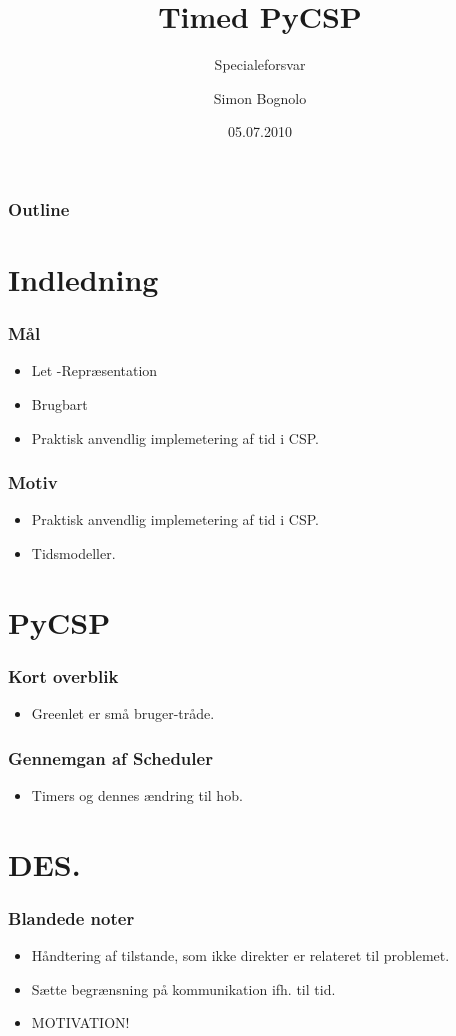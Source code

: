 \documentclass{beamer}
\title
{Timed PyCSP}
\subtitle
{Specialeforsvar}
\author
{Simon Bognolo}
\date
{05.07.2010}
\begin{document}
\begin{frame}
  \titlepage
\end{frame}

\begin{frame}
  \frametitle{Outline}
  \tableofcontents
\end{frame}

\section{Indledning}
\begin{frame}
  \frametitle{Mål}
  \begin{itemize}
	\item Let -Repræsentation
	\item Brugbart
	\item Praktisk anvendlig implemetering af tid i CSP.
  \end{itemize}
\end{frame}

\begin{frame}
  \frametitle{Motiv}
  \begin{itemize}
	\item Praktisk anvendlig implemetering af tid i CSP.
	\item Tidsmodeller.
  \end{itemize}
\end{frame}

\section{PyCSP}
\begin{frame}		
  \frametitle{Kort overblik}
  \begin{itemize}
	\item Greenlet er små bruger-tråde.
  \end{itemize}
\end{frame}

\begin{frame}
  \frametitle{Gennemgan af Scheduler}
  \begin{itemize}
	\item Timers og dennes ændring til hob.
  \end{itemize}
\end{frame}



\section{DES.}
\begin{frame}
  \frametitle{Blandede noter}
  \begin{itemize}
    \item Håndtering af tilstande, som ikke direkter er relateret til problemet.
    \item Sætte begrænsning på kommunikation ifh. til tid.
    \item MOTIVATION!
  \end{itemize}
\end{frame}
\end{document}
